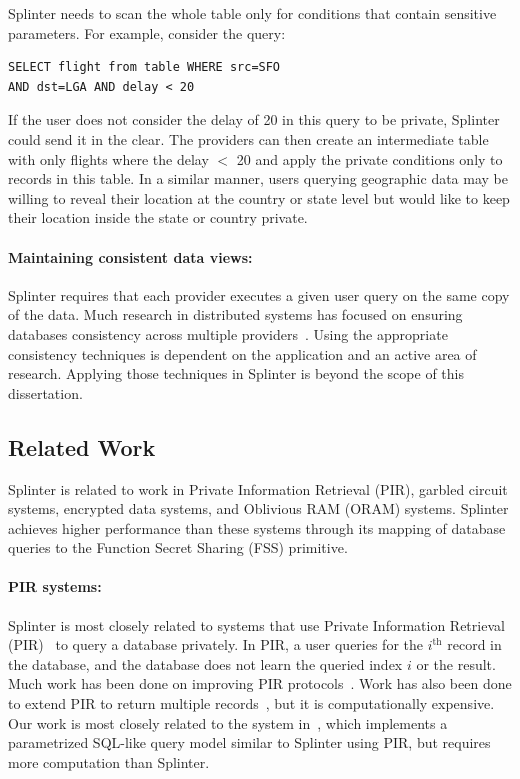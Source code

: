Splinter needs to scan the whole table only for conditions 
that contain sensitive parameters.
For example, consider the query:
\begin{verbatim}
SELECT flight from table WHERE src=SFO 
AND dst=LGA AND delay < 20
\end{verbatim}
If the user does not consider the delay of 20 in this query to be
private, Splinter could send it in the clear.
The providers can then create an intermediate
table with only flights where the delay $<$ 20 and apply the private
conditions only to records in this table.
In a similar manner, users querying geographic data may be willing to
reveal their location at the country or state level but would like to
keep their location inside the state or country private.

\paragraph{Maintaining consistent data views:}
Splinter requires that each provider executes a given user
query on the same copy of the data. 
Much research in distributed systems has focused on ensuring
databases consistency across multiple providers~\cite{spanner, ongaro:raft, tu:silo}.
Using the appropriate consistency techniques is dependent
on the application and an active area of research.
Applying those techniques in Splinter is beyond the scope
of this dissertation.


\subsection{Related Work}
\label{spl-sec:related}
Splinter is related to work in Private Information Retrieval (PIR),
garbled circuit systems, encrypted data systems, 
and Oblivious RAM (ORAM) systems. Splinter achieves higher performance than these systems 
through its mapping of database queries to the Function Secret Sharing (FSS) primitive.

\paragraph{PIR systems:}
Splinter is most closely related to systems that use Private
Information Retrieval (PIR)~\cite{chor1998private} to query a database privately.
In PIR, a user queries for the $i^\mathrm{th}$ record in the database, and the database
does not learn the queried index $i$ or the result.
Much work has been done on improving 
PIR protocols~\cite{ostrovsky2007survey, olumofin2011revisiting}. 
Work has also been done to extend PIR to return multiple records~\cite{groth2010multi},
but it is computationally expensive.
Our work is most closely related to the system in~\cite{goldberg}, which implements
a parametrized SQL-like query model similar to Splinter using PIR, but requires
more computation than Splinter.

